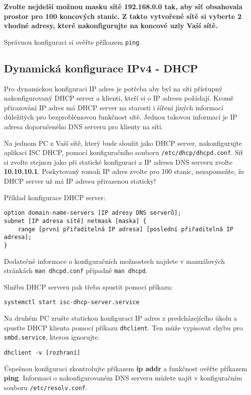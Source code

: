 \documentclass[a4paper,11pt,draft]{article}
\begin{document}
{\bf Zvolte nejdelší možnou masku sítě 192.168.0.0 tak, aby síť obsahovala
prostor pro 100 koncových stanic. Z takto vytvořené sítě si vyberte 2 vhodné
adresy, které nakonfigurujte na koncové uzly Vaší sítě.}

Správnou konfiguraci si ověřte příkazem {\tt ping}.

\subsection{Dynamická konfigurace IPv4 - DHCP}
Pro dynamickou konfiguraci IP adres je potřeba aby byl na síti přístupný
nakonfigurovaný DHCP server a klienti, kteří si o IP adresu požádají. Kromě
přirazování IP adres má DHCP server na starosti i šíření jiných informací
důležitých pro bezproblémovou funkčnost sítě. Jednou takovou informací je IP
adresa doporučeného DNS serveru pro klienty na síti.

Na jednom PC z Vaší sítě, který bude sloužit jako DHCP server, nakonfigurujte
aplikaci ISC DHCP, pomocí konfiguračního souboru \verb_/etc/dhcp/dhcpd.conf_.
Síť si zvolte stejnou jako při statické konfiguraci a IP adresu DNS serveru
zvolte {\bf 10.10.10.1}. Poskytovaný rozsah IP adres zvolte pro 100 stanic,
nezapomeňte, že DHCP server už má IP adresu přirazenou staticky!

Příklad konfigurace DHCP server:
\begin{verbatim}
option domain-name-servers [IP adresy DNS serverů];
subnet [IP adresa sítě] netmask [maska] {
    range [první přiřaditelná IP adresa] [poslední přiřaditelná IP adresa];
}
\end{verbatim}
Dodatečné informace o konfiguračních možnostech najdete v manuálových stránkách
{\tt man dhcpd.conf} případně {\tt man dhcpd}.

Službu DHCP serveru pak třeba spustit pomocí příkazu:
\begin{verbatim}
systemctl start isc-dhcp-server.service
\end{verbatim}

Na druhém PC zrušte statickou konfiguraci IP adres z predcházejícího úkolu a
spusťte DHCP klienta pomocí příkazu {\tt dhclient}. Ten může vypisovat chybu
pro {\tt smbd.service}, kterou ignorujte.
\begin{verbatim}
dhclient -v [rozhraní]
\end{verbatim}

Úspešnou konfiguraci zkontrolujte příkazem {\bf ip addr} a funkčnost ověřte
příkazem {\bf ping}. Informaci o nakonfigurovaném DNS serveru můžete najít v
konfiguračním souboru \verb_/etc/resolv.conf_.
\end{document}
